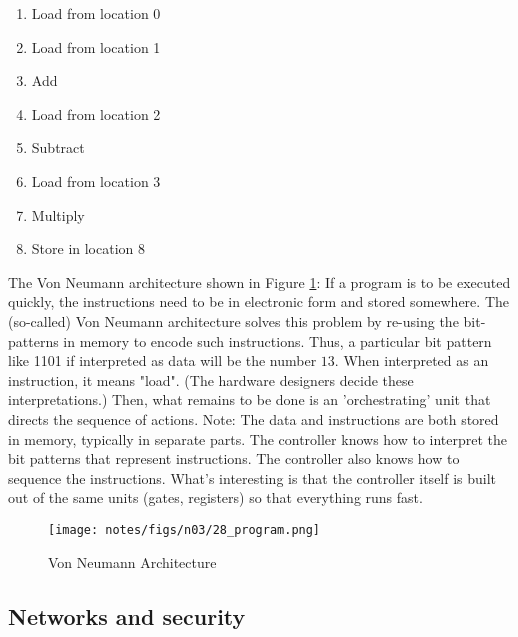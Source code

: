 \documentclass[main.tex]{subfiles}
\begin{document}
\begin{enumerate}
    \item Load from location 0
    \item Load from location 1
    \item Add
    \item Load from location 2
    \item Subtract
    \item Load from location 3
    \item Multiply
    \item Store in location 8
\end{enumerate}

The Von Neumann architecture shown in Figure \ref{fig28:von_naumann_architecture}: If a program is to be executed quickly, the instructions need to be in electronic form and stored somewhere. The (so-called) Von Neumann architecture solves this problem by re-using the bit-patterns in memory to encode such instructions. Thus, a particular bit pattern like 1101 if interpreted as data will be the number $13$. When interpreted as an instruction, it means "load". (The hardware designers decide these interpretations.) Then, what remains to be done is an 'orchestrating' unit that directs the sequence of actions. Note: The data and instructions are both stored in memory, typically in separate parts. The controller knows how to interpret the bit patterns that represent instructions. The controller also knows how to sequence the instructions. What's interesting is that the controller itself is built out of the same units (gates, registers) so that everything runs fast.

\begin{figure}
    \centering
    \texttt{[image: notes/figs/n03/28\_program.png]}
    \caption{Von Neumann Architecture}
    \label{fig28:von_naumann_architecture}
\end{figure}

\subsection{Networks and security}
\end{document}
